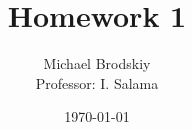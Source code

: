 


\title{Homework 1}
\date{\today}
\author{Michael Brodskiy\\ \small Professor: I. Salama}



\maketitle

